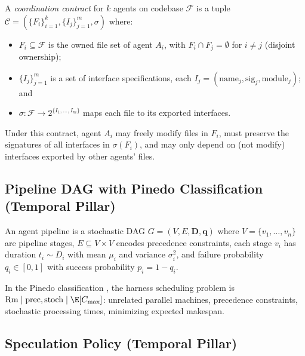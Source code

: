 \begin{definition}
\label{def:ext-contract}
A \emph{coordination contract} for $k$ agents on codebase $\mathcal{F}$ is a
tuple $\mathcal{C} = (\{F_i\}_{i=1}^k, \{I_j\}_{j=1}^m, \sigma)$ where:
\begin{itemize}[nosep]
  \item $F_i \subseteq \mathcal{F}$ is the owned file set of agent $A_i$,
        with $F_i \cap F_j = \emptyset$ for $i \neq j$ (disjoint ownership);
  \item $\{I_j\}_{j=1}^m$ is a set of interface specifications,
        each $I_j = (\mathrm{name}_j, \mathrm{sig}_j, \mathrm{module}_j)$; and
  \item $\sigma: \mathcal{F} \to 2^{\{I_1,\ldots,I_m\}}$ maps each file to its
        exported interfaces.
\end{itemize}
Under this contract, agent $A_i$ may freely modify files in $F_i$,
must preserve the signatures of all interfaces in $\sigma(F_i)$,
and may only depend on (not modify) interfaces exported by other agents' files.
\end{definition}


\subsection{Pipeline DAG with Pinedo Classification (Temporal Pillar)}

\begin{definition}
\label{def:ext-pipeline}
An agent pipeline is a stochastic DAG $G = (V, E, \mathbf{D}, \mathbf{q})$ where
$V = \{v_1, \ldots, v_n\}$ are pipeline stages,
$E \subseteq V \times V$ encodes precedence constraints,
each stage $v_i$ has duration $t_i \sim D_i$ with mean $\mu_i$ and
variance $\sigma_i^2$, and failure probability $q_i \in [0,1]$
with success probability $p_i = 1 - q_i$.
\end{definition}

In the Pinedo classification \citep{pinedo2016scheduling}, the harness scheduling
problem is $\mathrm{Rm} \mid \mathrm{prec}, \mathrm{stoch} \mid \E[C_{\max}]$:
unrelated parallel machines, precedence constraints, stochastic processing times,
minimizing expected makespan.


\subsection{Speculation Policy (Temporal Pillar)}

